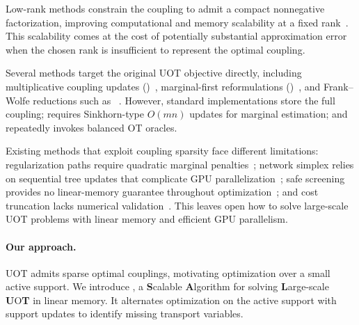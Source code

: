 Low-rank methods constrain the coupling to admit a compact nonnegative factorization, improving computational and memory scalability at a fixed rank~\citep{scetbon2023unbalanced,halmos2024low}.
This scalability comes at the cost of potentially substantial approximation error when the chosen rank is insufficient to represent the optimal coupling.

Several methods target the original UOT objective directly, including multiplicative coupling updates (\mm)~\citep{chapel2021unbalanced}, marginal-first reformulations (\etm)~\citep{liu2026solving}, and Frank--Wolfe reductions such as \hellouot~\citep{sejourne2022faster,xia2026dual}.
However, standard \mm implementations store the full coupling; \etm requires Sinkhorn-type $O(mn)$ updates for marginal estimation; and \hellouot repeatedly invokes balanced OT oracles.

Existing methods that exploit coupling sparsity face different limitations: regularization paths require quadratic marginal penalties~\citep{chapel2021unbalanced}; 
network simplex relies on sequential tree updates that complicate GPU parallelization~\citep{agazzotti2026network}; 
safe screening provides no linear-memory guarantee throughout optimization~\citep{su2025safe}; 
and cost truncation lacks numerical validation~\citep{auricchio2026transport}.
This leaves open how to solve large-scale UOT problems with linear memory and efficient GPU parallelism.

\paragraph{Our approach.}
UOT admits sparse optimal couplings, motivating optimization over a small active support.
We introduce \ours, a \textbf{S}calable \textbf{A}lgorithm for solving \textbf{L}arge-scale \textbf{U}O\textbf{T} in linear memory.
It alternates optimization on the active support with support updates to identify missing transport variables.

